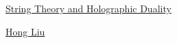 \documentclass[11pt]{article}
\begin{document}
	\kaishu 
	\setcounter{section}{0}
	\begin{center}
		{\LARGE  \href{https://ocw.mit.edu/courses/8-821-string-theory-and-holographic-duality-fall-2014/}{String Theory and Holographic Duality}}
		
		{\large \href{https://physics.mit.edu/faculty/hong-liu/}{Hong Liu}}
	\end{center}
\setcounter{page}{1}


\vspace{-0.75cm}
\end{document}

